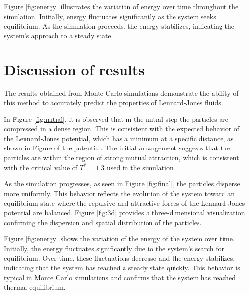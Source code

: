 \documentclass[a4paper,12pt]{article}
\begin{document}
Figure \ref{fig:energy} illustrates the variation of energy over time throughout the simulation. Initially, energy fluctuates significantly as the system seeks equilibrium. As the simulation proceeds, the energy stabilizes, indicating the system's approach to a steady state.



\section{Discussion of results}
\begin{multicols}{2}
The results obtained from Monte Carlo simulations demonstrate the ability of this method to accurately predict the properties of Lennard-Jones fluids. 

In Figure \ref{fig:initial}, it is observed that in the initial step the particles are compressed in a dense region. This is consistent with the expected behavior of the Lennard-Jones potential, which has a minimum at a specific distance, as shown in Figure of the potential. The initial arrangement suggests that the particles are within the region of strong mutual attraction, which is consistent with the critical value of \( T^* = 1.3 \) used in the simulation.

As the simulation progresses, as seen in Figure \ref{fig:final}, the particles disperse more uniformly. This behavior reflects the evolution of the system toward an equilibrium state where the repulsive and attractive forces of the Lennard-Jones potential are balanced. Figure \ref{fig:3d} provides a three-dimensional visualization confirming the dispersion and spatial distribution of the particles.

Figure \ref{fig:energy} shows the variation of the energy of the system over time. Initially, the energy fluctuates significantly due to the system's search for equilibrium. Over time, these fluctuations decrease and the energy stabilizes, indicating that the system has reached a steady state quickly. This behavior is typical in Monte Carlo simulations and confirms that the system has reached thermal equilibrium.
\end{multicols}
\end{document}
